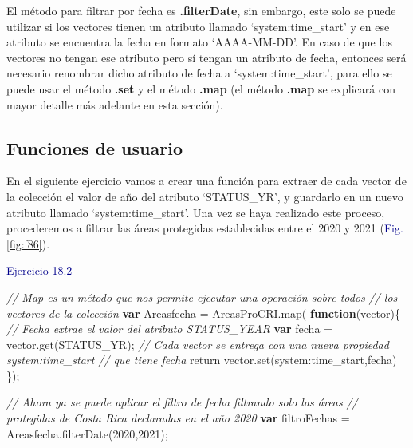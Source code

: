 \documentclass[
  12pt,
  letterpaper,
  twoside]{book}
\newenvironment{Shaded}{\begin{snugshade}}{\end{snugshade}}
\newcommand{\CommentTok}[1]{\textcolor[rgb]{0.24,0.58,0.00}{\textit{#1}}}
\newcommand{\ControlFlowTok}[1]{\textcolor[rgb]{0.00,0.00,0.00}{#1}}
\newcommand{\DecValTok}[1]{\textcolor[rgb]{0.28,0.53,0.93}{#1}}
\newcommand{\FunctionTok}[1]{\textcolor[rgb]{0.48,0.12,0.64}{#1}}
\newcommand{\KeywordTok}[1]{\textcolor[rgb]{0.00,0.00,0.00}{\textbf{#1}}}
\newcommand{\NormalTok}[1]{#1}
\newcommand{\OperatorTok}[1]{\textcolor[rgb]{0.00,0.00,0.00}{#1}}
\newcommand{\StringTok}[1]{\textcolor[rgb]{0.87,0.29,0.22}{#1}}
\newcommand\boldpurple[1]{\textcolor{darkpurple}{\textbf{#1}}}
\begin{document}
El método para filtrar por fecha es \boldpurple{.filterDate}, sin embargo, este solo se puede utilizar si los vectores tienen un atributo llamado `system:time\_start' y en ese atributo se encuentra la fecha en formato `AAAA-MM-DD'. En caso de que los vectores no tengan ese atributo pero sí tengan un atributo de fecha, entonces será necesario renombrar dicho atributo de fecha a `system:time\_start', para ello se puede usar el método \boldpurple{.set} y el método \boldpurple{.map} (el método \boldpurple{.map} se explicará con mayor detalle más adelante en esta sección).

\hypertarget{funciones-de-usuario}{%
\subsection*{Funciones de usuario}\label{funciones-de-usuario}}

En el siguiente ejercicio vamos a crear una función para extraer de cada vector de la colección el valor de año del atributo `STATUS\_YR', y guardarlo en un nuevo atributo llamado `system:time\_start'. Una vez se haya realizado este proceso, procederemos a filtrar las áreas protegidas establecidas entre el 2020 y 2021 (\textcolor{darkblue}{Fig.} \ref{fig:f86}).

\textcolor{darkblue}{Ejercicio 18.2}

\begin{Shaded}
\begin{Highlighting}[]
\CommentTok{// Map es un método que nos permite ejecutar una operación sobre todos }
\CommentTok{// los vectores de la colección}
\KeywordTok{var}\NormalTok{ Areasfecha }\OperatorTok{=}\NormalTok{ AreasProCRI}\OperatorTok{.}\FunctionTok{map}\NormalTok{( }\KeywordTok{function}\NormalTok{(vector)\{ }
  \CommentTok{// Fecha extrae el valor del atributo \textquotesingle{}STATUS\_YEAR\textquotesingle{}}
  \KeywordTok{var}\NormalTok{ fecha }\OperatorTok{=}\NormalTok{ vector}\OperatorTok{.}\FunctionTok{get}\NormalTok{(}\StringTok{\textquotesingle{}STATUS\_YR\textquotesingle{}}\NormalTok{)}\OperatorTok{;}   
  \CommentTok{// Cada vector se entrega con una nueva propiedad \textquotesingle{}system:time\_start\textquotesingle{} }
  \CommentTok{// que tiene fecha}
  \ControlFlowTok{return}\NormalTok{ vector}\OperatorTok{.}\FunctionTok{set}\NormalTok{(}\StringTok{\textquotesingle{}system:time\_start\textquotesingle{}}\OperatorTok{,}\NormalTok{fecha)}
\NormalTok{\})}\OperatorTok{;} 

\CommentTok{// Ahora ya se puede aplicar el filtro de fecha filtrando solo las áreas }
\CommentTok{// protegidas de Costa Rica declaradas en el año 2020}
\KeywordTok{var}\NormalTok{ filtroFechas }\OperatorTok{=}\NormalTok{ Areasfecha}\OperatorTok{.}\FunctionTok{filterDate}\NormalTok{(}\DecValTok{2020}\OperatorTok{,}\DecValTok{2021}\NormalTok{)}\OperatorTok{;} 
\end{Highlighting}
\end{Shaded}
\end{document}
